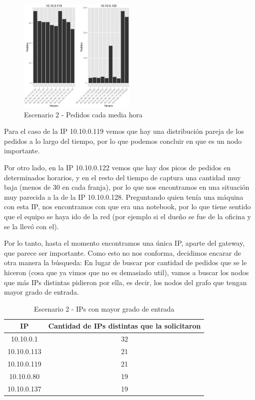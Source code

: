     \begin{figure}[H]
		\centering
		\includegraphics[width=0.5\textwidth]{img/graph/escenario_2/requestsCadaMediaHora119y122.eps}
		\caption{Escenario 2 - Pedidos cada media hora}
		\label{fig:escenario2_requestsCadaMediaHora119y122}
	\end{figure}
    \par Para el caso de la IP 10.10.0.119 vemos que hay una distribución pareja de los pedidos a lo largo del tiempo, por lo que podemos concluir en que es un nodo importante. 
    \par Por otro lado, en la IP 10.10.0.122 vemos que hay dos picos de pedidos en determinados horarios, y en el resto del tiempo de captura una cantidad muy baja (menos de 30 en cada franja), por lo que nos encontramos en una situación muy parecida a la de la IP 10.10.0.128. Preguntando quien tenía una máquina con esta IP, nos encontramos con que era una notebook, por lo que tiene sentido que el equipo se haya ido de la red (por ejemplo si el dueño se fue de la oficina y se la llevó con el).
    \par Por lo tanto, hasta el momento encontramos una única IP, aparte del gateway, que parece ser importante. Como esto no nos conforma, decidimos encarar de otra manera la búsqueda: En lugar de buscar por cantidad de pedidos que se le hiceron (cosa que ya vimos que no es demasiado util), vamos a buscar los nodos que más IPs distintas pidieron por ella, es decir, los nodos del grafo que tengan mayor grado de entrada.    
    \begin{table}[H]
		\caption{Escenario 2 - IPs con mayor grado de entrada}
		\centering
		\begin{tabular}{c c}
          IP & Cantidad de IPs distintas que la solicitaron \\
          \hline 
          10.10.0.1 & 32 \\ 
          10.10.0.113 & 21 \\
          10.10.0.119 & 21 \\
          10.10.0.80 & 19 \\
          10.10.0.137 & 19 \\   
  		\end{tabular}
  	\end{table}
